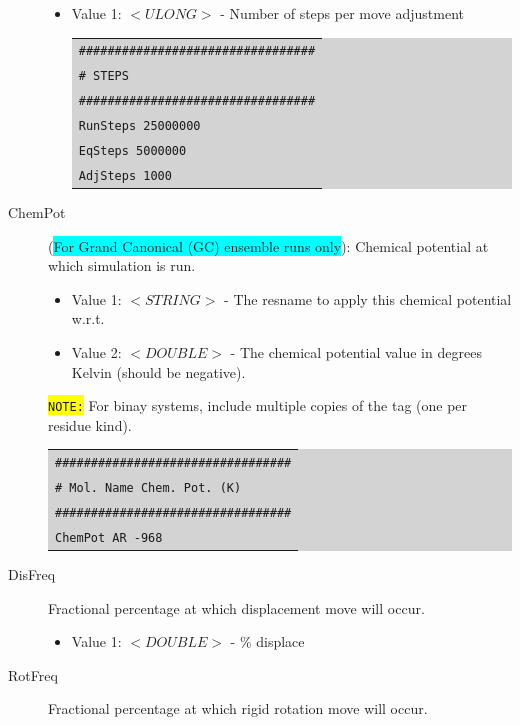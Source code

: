 \begin{description}
	\begin{itemize}
	\item Value 1: $<ULONG>$ - Number of steps per move adjustment\\
	\colorbox{lightgray}{
	\begin{tabular}{l}
	\texttt{\#\#\#\#\#\#\#\#\#\#\#\#\#\#\#\#\#\#\#\#\#\#\#\#\#\#\#\#\#\#\#\#\#}\\
	\texttt{\# STEPS}\\
	\texttt{\#\#\#\#\#\#\#\#\#\#\#\#\#\#\#\#\#\#\#\#\#\#\#\#\#\#\#\#\#\#\#\#\#}\\
	\texttt{RunSteps           25000000}\\
	\texttt{EqSteps		   5000000}\\
	\texttt{AdjSteps	        1000}\\
	\end{tabular}}
	\end{itemize}
\item [ChemPot] (\colorbox{cyan}{For Grand Canonical (GC) ensemble runs only}): Chemical potential at which simulation is run.
	\begin{itemize}
	\item Value 1: $<STRING>$ - The resname to apply this chemical potential w.r.t.
	\item Value 2: $<DOUBLE>$ - The chemical potential value in degrees Kelvin (should be negative).
	\end{itemize}
	\colorbox{yellow}{\texttt{NOTE:}} For binay systems, include multiple copies of the tag (one per residue kind).\\
	\colorbox{lightgray}{
	\begin{tabular}{l}
	\texttt{\#\#\#\#\#\#\#\#\#\#\#\#\#\#\#\#\#\#\#\#\#\#\#\#\#\#\#\#\#\#\#\#\#}\\
	\texttt{\#  Mol. Name    Chem. Pot. (K)}\\
	\texttt{\#\#\#\#\#\#\#\#\#\#\#\#\#\#\#\#\#\#\#\#\#\#\#\#\#\#\#\#\#\#\#\#\#}\\
	\texttt{ChemPot        AR               -968}\\
	\end{tabular}}
\item [DisFreq] Fractional percentage at which displacement move will occur.
	\begin{itemize}
	\item Value 1: $<DOUBLE>$ - \% displace
	\end{itemize}
\item [RotFreq] Fractional percentage at which rigid rotation move will occur.
	\begin{itemize}

\end{itemize}
\end{description}
